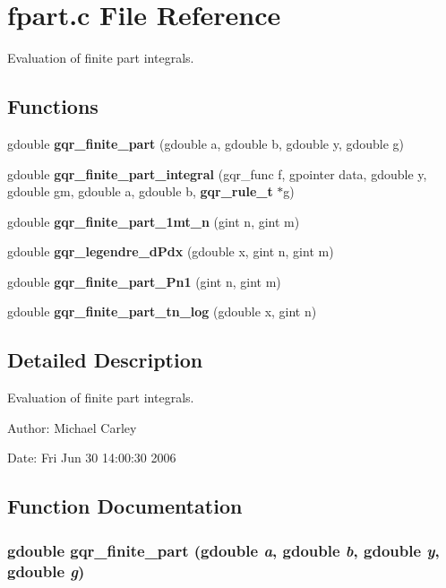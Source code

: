\section{fpart.c File Reference}
\label{fpart_8c}
Evaluation of finite part integrals. 

\subsection*{Functions}
\begin{CompactItemize}
\item 
gdouble {\bf gqr\_\-finite\_\-part} (gdouble a, gdouble b, gdouble y, gdouble g)
\item 
gdouble {\bf gqr\_\-finite\_\-part\_\-integral} (gqr\_\-func f, gpointer data, gdouble y, gdouble gm, gdouble a, gdouble b, {\bf gqr\_\-rule\_\-t} $\ast$g)
\item 
gdouble {\bf gqr\_\-finite\_\-part\_\-1mt\_\-n} (gint n, gint m)
\item 
gdouble {\bf gqr\_\-legendre\_\-dPdx} (gdouble x, gint n, gint m)
\item 
gdouble {\bf gqr\_\-finite\_\-part\_\-Pn1} (gint n, gint m)
\item 
gdouble {\bf gqr\_\-finite\_\-part\_\-tn\_\-log} (gdouble x, gint n)
\end{CompactItemize}


\subsection{Detailed Description}
Evaluation of finite part integrals. 

\begin{Desc}
\item[Author:]Michael Carley \end{Desc}
\begin{Desc}
\item[Date:]Fri Jun 30 14:00:30 2006 \end{Desc}


\subsection{Function Documentation}
\subsubsection{\setlength{\rightskip}{0pt plus 5cm}gdouble gqr\_\-finite\_\-part (gdouble {\em a}, \/  gdouble {\em b}, \/  gdouble {\em y}, \/  gdouble {\em g})}\label{fpart_8c_d3b485753045033ddc1c8f73909aa6e3}


